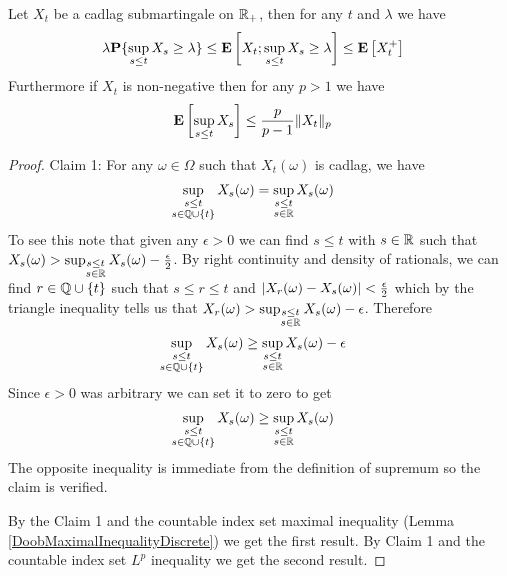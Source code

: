 \begin{lem}\label{DoobMaximalInequalityContinuous}Let $X_t$ be a
  cadlag submartingale on $\mathbb{R}_+$, then for any $t$ and $\lambda$ we have
\begin{align*}
\lambda \textbf{P}\{\sup_{s \leq t} X_s \geq \lambda\} &\leq
\textbf{E}\left[X_t ; \sup_{s \leq t} X_s \geq \lambda\right] \leq \textbf{E}\left[X_t^+\right]
\end{align*}
Furthermore if $X_t$ is non-negative then for any $p > 1$ we have
\begin{align*}
\textbf{E}\left[\sup_{s \leq t} X_s\right] &\leq \frac{p}{p-1}\lVert X_t \rVert_p
\end{align*}
\end{lem}
\begin{proof}
Claim 1:  For any $\omega \in \Omega$ such that
$X_t(\omega)$ is cadlag, we have
\begin{align*}
\sup_{\substack{s \leq t \\ s \in \mathbb{Q} \cup \lbrace t \rbrace }}
X_s(\omega) &= \sup_{\substack{s \leq t \\ s \in \mathbb{R} }}
X_s(\omega)
\end{align*}
To see this note that given any $\epsilon > 0$ we can find $s \leq t$
with $s \in \mathbb{R}$ such that $X_s(\omega) > \sup_{\substack{s \leq t \\ s \in \mathbb{R} }}
X_s(\omega) - \frac{\epsilon}{2}$.  By right continuity and density of
rationals, we can find
$r \in \mathbb{Q} \cup \lbrace t \rbrace$ such that $s \leq r \leq t$
and $\left \vert X_r(\omega) - X_s(\omega) \right \vert < \frac{\epsilon}{2}$ which by
the triangle inequality tells us that $X_r(\omega) > \sup_{\substack{s \leq t \\ s \in \mathbb{R} }}
X_s(\omega) - \epsilon$.  Therefore 
\begin{align*}
\sup_{\substack{s \leq t \\ s \in \mathbb{Q} \cup \lbrace t \rbrace }}
X_s(\omega) &\geq \sup_{\substack{s \leq t \\ s \in \mathbb{R} }}
X_s(\omega) -\epsilon
\end{align*}  Since $\epsilon > 0$ was arbitrary we can set
it to zero to get 
\begin{align*}
\sup_{\substack{s \leq t \\ s \in \mathbb{Q} \cup \lbrace t \rbrace }}
X_s(\omega) &\geq \sup_{\substack{s \leq t \\ s \in \mathbb{R} }}
X_s(\omega)
\end{align*}
The opposite inequality is immediate from the definition of supremum
so the claim is verified.

By the Claim 1 and the countable index set maximal inequality (Lemma
\ref{DoobMaximalInequalityDiscrete}) we get the first result.  By
Claim 1 and the countable index set $L^p$ inequality we get the second result.
\end{proof}

